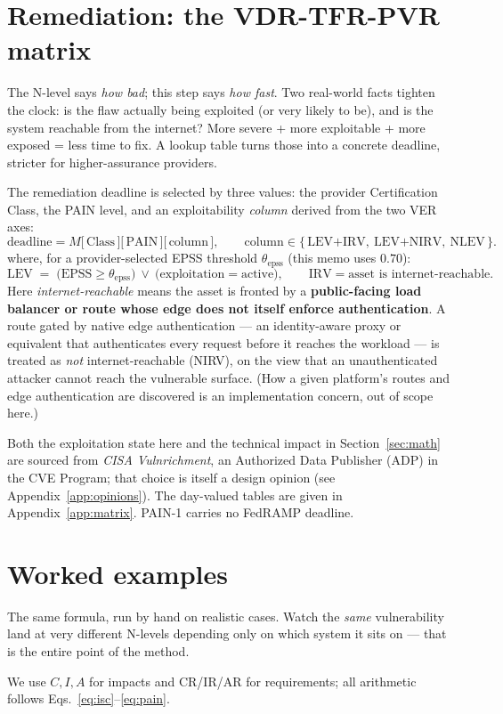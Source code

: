 \documentclass[11pt]{article}
\begin{document}
\section{Remediation: the VDR-TFR-PVR matrix}
\label{sec:remediation}
\begin{plain}
The N-level says \emph{how bad}; this step says \emph{how fast}. Two real-world facts
tighten the clock: is the flaw actually being exploited (or very likely to be), and
is the system reachable from the internet? More severe + more exploitable + more
exposed = less time to fix. A lookup table turns those into a concrete deadline,
stricter for higher-assurance providers.
\end{plain}
The remediation deadline is selected by three values: the provider Certification
Class, the PAIN level, and an exploitability \emph{column} derived from the two VER
axes:
\[
\text{deadline} = M\big[\,\text{Class}\,\big]\big[\,\text{PAIN}\,\big]\big[\,\text{column}\,\big],
\qquad
\text{column} \in \{\,\text{LEV+IRV},\ \text{LEV+NIRV},\ \text{NLEV}\,\}.
\]
where, for a provider-selected EPSS threshold $\theta_{\text{epss}}$ (this memo uses
$0.70$):
\[
\text{LEV} \;=\; \big(\text{EPSS} \ge \theta_{\text{epss}}\big)\ \lor\ \big(\text{exploitation} = \text{active}\big),
\qquad
\text{IRV} = \text{asset is internet-reachable}.
\]
Here \emph{internet-reachable} means the asset is fronted by a \textbf{public-facing
load balancer or route whose edge does not itself enforce authentication}. A route
gated by native edge authentication --- an identity-aware proxy or equivalent that
authenticates every request before it reaches the workload --- is treated as
\emph{not} internet-reachable (NIRV), on the view that an unauthenticated attacker
cannot reach the vulnerable surface. (How a given platform's routes and edge
authentication are discovered is an implementation concern, out of scope here.)

Both the exploitation state here and the technical impact in
Section~\ref{sec:math} are sourced from \emph{CISA Vulnrichment}, an Authorized Data
Publisher (ADP) in the CVE Program; that choice is itself a design opinion (see
Appendix~\ref{app:opinions}). The day-valued tables are given in
Appendix~\ref{app:matrix}. PAIN-1 carries no FedRAMP deadline.

\section{Worked examples}
\begin{plain}
The same formula, run by hand on realistic cases. Watch the \emph{same}
vulnerability land at very different N-levels depending only on which system it sits
on --- that is the entire point of the method.
\end{plain}
We use $C,I,A$ for impacts and CR/IR/AR for requirements; all arithmetic follows
Eqs.~\eqref{eq:isc}--\eqref{eq:pain}.
\end{document}
